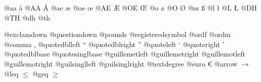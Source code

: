 \documentclass{book}
\begin{document}
@aa \aa{}
@AA \AA{}
@ae \ae{}
@oe \oe{}
@AE \AE{}
@OE \OE{}
@o \o{}
@O \O{}
@ss \ss{}
@l \l{}
@L \L{}
@DH \DH{}
@TH \TH{}
@dh \dh{}
@th \th{}

@exclamdown \textexclamdown{}
@questiondown \textquestiondown{}
@pounds \textsterling{}
@registeredsymbol \circledR{}
@ordf \textordfeminine{}
@ordm \textordmasculine{}
@comma ,
@quotedblleft \textquotedblleft{}
@quotedblright \textquotedblright{}
@quoteleft \textquoteleft{}
@quoteright \textquoteright{}
@quotedblbase \quotedblbase{}
@quotesinglbase \quotesinglbase{}
@guillemetleft \guillemotleft{}
@guillemetright \guillemotright{}
@guillemotleft \guillemotleft{}
@guillemotright \guillemotright{}
@guilsinglleft \guilsinglleft{}
@guilsinglright \guilsinglright{}
@textdegree \textdegree{}
@euro \euro{}
@arrow $\rightarrow{}$
@leq $\leq{}$
@geq $\geq{}$
\end{document}
